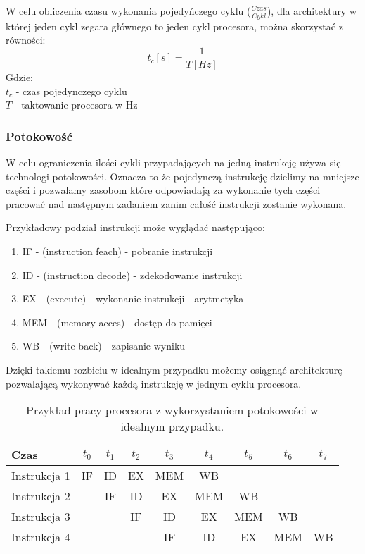 W celu obliczenia czasu wykonania pojedyńczego cyklu ($\frac{Czas}{Cykl}$), dla architektury w której jeden cykl zegara głównego to jeden cykl procesora, można skorzystać z równości:
\begin{equation}
        \label{Cykli w sec}
        t_c [s]= \frac{1}{T [Hz]}
\end{equation} 
Gdzie:\\
\indent $t_c$ - czas pojedynczego cyklu \\
\indent $T$ - taktowanie procesora w Hz

\subsubsection{Potokowość}

W celu ograniczenia ilości cykli przypadających na jedną instrukcję używa się technologi potokowości. 
Oznacza to że pojedynczą instrukcję dzielimy na mniejsze części i pozwalamy zasobom które odpowiadają za wykonanie tych części pracować nad następnym zadaniem zanim całość instrukcji zostanie wykonana.

Przykładowy podział instrukcji może wyglądać następująco:
\begin{enumerate}
        \item IF - (instruction feach) - pobranie instrukcji
        \item ID - (instruction decode) -  zdekodowanie instrukcji
        \item EX - (execute) - wykonanie instrukcji - arytmetyka
        \item MEM - (memory acces) - dostęp do pamięci
        \item WB - (write back) - zapisanie wyniku
\end{enumerate}

Dzięki takiemu rozbiciu w idealnym przypadku możemy osiągnąć architekturę pozwalającą wykonywać każdą instrukcję w jednym cyklu procesora. 

\begin{table}{}
        \centering
        \caption{Przykład pracy procesora z wykorzystaniem potokowości w idealnym przypadku.}
        \label{pipelining}
        \begin{tabular}{lcccccccc}
                Czas & $t_0$&$t_1$&$t_2$&$t_3$&$t_4$&$t_5$&$t_6$&$t_7$ \\ \hline
                Instrukcja 1 & IF & ID & EX & MEM & WB &    & \\
                Instrukcja 2 &    & IF & ID & EX & MEM & WB & \\
                Instrukcja 3 &    &    & IF & ID & EX & MEM & WB \\
                Instrukcja 4 &    &    &    & IF & ID & EX & MEM & WB
        \end{tabular}
\end{table}


